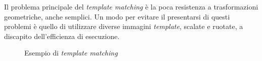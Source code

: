 Il problema principale del \textit{template matching} \`e la poca resistenza a trasformazioni geometriche, anche semplici. Un modo per evitare il presentarsi di questi problemi \`e quello di utilizzare diverse immagini \textit{template}, scalate e ruotate, a discapito dell'efficienza di esecuzione.
\begin{figure}[H]
	\centering
	\caption{Esempio di \textit{template matching}} \label{fig:template-matching}
\end{figure}


